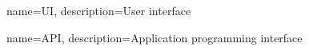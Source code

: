 {
    name={UI},
    description={User interface}
}

{
    name={API},
    description={Application programming interface}
}
